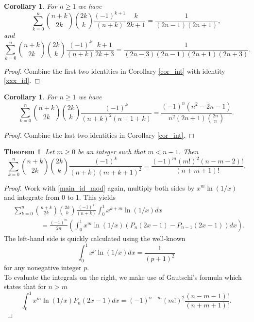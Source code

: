 \documentclass[11pt,reqno]{amsart}
\theoremstyle{plain}
\numberwithin{equation}{section}
\newtheorem{theorem}[thm]{Theorem}
\newtheorem{corollary}[thm]{Corollary}
\begin{document}
\begin{corollary}
For $n\geq 1$ we have
\begin{equation}
\sum_{k=0}^{n} \binom{n+k}{2k} \binom{2k}{k} \frac{(-1)^{k+1}}{(n+k)}\frac{k}{2k+1} = \frac{1}{(2n-1)(2n+1)},
\end{equation}
and
\begin{equation}
\sum_{k=0}^{n} \binom{n+k}{2k} \binom{2k}{k} \frac{(-1)^{k}}{(n+k)}\frac{k+1}{2k+3} = \frac{1}{(2n-3)(2n-1)(2n+1)(2n+3)}.
\end{equation}
\end{corollary}
\begin{proof}
Combine the first two identities in Corollary \ref{cor_int} with identity \eqref{xxx_id}.
\end{proof}

\begin{corollary}
For $n\geq 1$ we have
\begin{equation}
\sum_{k=0}^{n} \binom{n+k}{2k} \binom{2k}{k} \frac{(-1)^{k}}{(n+k)^2 (n+1+k)} = \frac{(-1)^n (n^2-2n-1)}{n^2 (2n+1)\binom{2n}{n}}.
\end{equation}
\end{corollary}
\begin{proof}
Combine the last two identities in Corollary \ref{cor_int}.
\end{proof}

\begin{theorem}\label{main_int_thm2}
Let $m\geq 0$ be an integer such that $m<n-1$. Then
\begin{equation}
\sum_{k=0}^{n} \binom{n+k}{2k} \binom{2k}{k} \frac{(-1)^k}{(n+k)(m+k+1)^2} = \frac{(-1)^m (m!)^2 (n-m-2)!}{(n+m+1)!} 
.
\end{equation}
\end{theorem}
\begin{proof}
Work with \eqref{main_id_mod} again, multiply both sides by $x^m \ln(1/x)$ and integrate from 0 to 1. This yields
\begin{align*}
&\sum_{k=0}^{n} \binom{n+k}{2k} \binom{2k}{k} \frac{(-1)^k}{(n+k)} \int_0^1 x^{k+m}\ln(1/x) dx \\
&\qquad\qquad = \frac{(-1)^m}{2n} \left ( \int_0^1 x^m\ln(1/x) (P_n(2x-1)-P_{n-1}(2x-1)) dx \right ).
\end{align*}
The left-hand side is quickly calculated using the well-known
$$\int_0^1 x^{p}\ln(1/x) dx = \frac{1}{(p+1)^2}$$
for any nonegative integer $p$. \\
To evaluate the integrals on the right, we make use of Gautschi's formula \cite{Gautschi} which states that for $n>m$
$$\int_0^1 x^m \ln(1/x) P_n(2x-1) dx = (-1)^{n-m} (m!)^2 \frac{(n-m-1)!}{(n+m+1)!}.$$
\end{proof}
\end{document}
